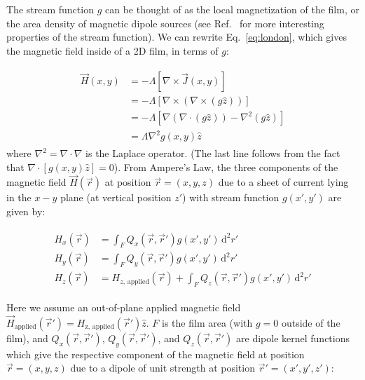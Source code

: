 \documentclass[final,3p,times]{elsarticle}
\newcounter{bla}
\begin{document}
The stream function $g$ can be thought of as the local magnetization of the film, or the area density of magnetic dipole sources (see Ref.~\cite{brandt_thin_2005} for more interesting properties of the stream function). We can rewrite Eq.~\ref{eq:london}, which gives the magnetic field inside of a 2D film, in terms of $g$:

\begin{align}
    \label{eq:london_stream}
    \begin{split}
        \vec{H}(x, y) &= -\Lambda\left[\nabla\times\vec{J}(x, y)\right]\\
        &= -\Lambda\left[\nabla\times\left(\nabla\times(g\hat{z})\right)\right]\\
        &= -\Lambda\left[\nabla(\nabla\cdot(g\hat{z}))-\nabla^2(g\hat{z})\right]\\
        &=\Lambda\nabla^2g(x,y)\hat{z}
    \end{split}
\end{align}
where $\nabla^2=\nabla\cdot\nabla$ is the Laplace operator. (The last line follows from the fact that $\nabla\cdot\left[g(x,y)\hat{z}\right] = 0$). From Ampere's Law, the three components of the magnetic field $\vec{H}(\vec{r})$ at position $\vec{r}=(x, y, z)$ due to a sheet of current lying in the $x-y$ plane (at vertical position $z'$) with stream function $g(x', y')$ are given by:

\begin{align}
    \label{eq:field_from_kernel}
    \begin{split}
        H_x(\vec{r}) &= \int_F Q_x(\vec{r},\vec{r}')g(x', y')\,\mathrm{d}^2r'\\
        H_y(\vec{r}) &= \int_F Q_y(\vec{r},\vec{r}')g(x', y')\,\mathrm{d}^2r'\\
        H_z(\vec{r}) &= H_{z,\,\mathrm{applied}}(\vec{r})
        + \int_F Q_z(\vec{r},\vec{r}')g(x', y')\,\mathrm{d}^2r'  
    \end{split}
\end{align}

Here we assume an out-of-plane applied magnetic field $\vec{H}_\mathrm{applied}(\vec{r}')=H_\mathrm{z,\,\mathrm{applied}}(\vec{r}')\hat{z}$. $F$ is the film area (with $g = 0$ outside of the film), and $Q_x(\vec{r},\vec{r}')$, $Q_y(\vec{r},\vec{r}')$, and $Q_z(\vec{r},\vec{r}')$ are dipole kernel functions which give the respective component of the magnetic field at position $\vec{r}=(x, y, z)$ due to a dipole of unit strength at position $\vec{r}'=(x', y', z')$:
\end{document}

